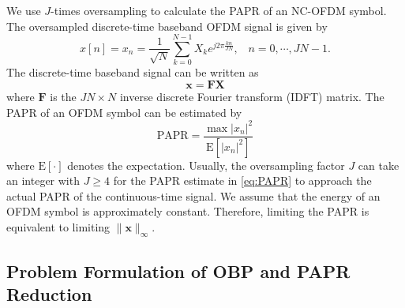 \documentclass[paper]{ieice}
\begin{document}
We use $J$-times oversampling to calculate the PAPR of an NC-OFDM symbol. The oversampled discrete-time baseband OFDM signal is given by 
\mathindent=0mm
\begin{equation} \label{eq:time_domain_signal_oversampling}
x[n] = x_n = \frac{1}{\sqrt{N}} \sum_{k=0}^{N-1} X_{k} e^{j 2 \pi \frac{kn}{JN}}, \,~~~ n = 0, \cdots, JN-1.
\end{equation}
\mathindent=7mm
The discrete-time baseband signal can be written as
\begin{equation}
\mathbf{x} = \mathbf{F}\mathbf{X}
\end{equation}
where $\mathbf{F}$ is the $JN \times N$  inverse discrete Fourier transform (IDFT) matrix.
The PAPR of an OFDM symbol can be estimated by
\begin{equation} \label{eq:PAPR}
\mathrm{PAPR} = \frac{\max|x_{n}|^{2}}{\mathrm{E}[|x_{n}|^{2}]}
\end{equation}
where $\mathrm{E}[\cdot]$ denotes the expectation. Usually, the oversampling factor $J$ can take an integer with $J \geq 4$ for the PAPR estimate in \eqref{eq:PAPR} to approach the actual PAPR of the continuous-time signal. We assume that the energy of an OFDM symbol is approximately constant. Therefore, limiting the PAPR is equivalent to limiting $\|\mathbf{x}\|_{\infty}$.

\subsection{Problem Formulation of OBP and PAPR Reduction}
\end{document}
